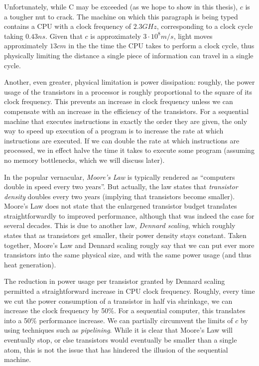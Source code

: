 Unfortunately, while C may be exceeded (as we hope to show in this
thesis), $c$ is a tougher nut to crack.  The machine on which this
paragraph is being typed contains a CPU with a clock frequency of
$2.3GHz$, corresponding to a clock cycle taking $0.43ns$.  Given that
$c$ is approximately $3\cdot10^{8}m/s$, light moves approximately
$13cm$ in the the time the CPU takes to perform a clock cycle, thus
physically limiting the distance a single piece of information can
travel in a single cycle.

Another, even greater, physical limitation is power dissipation:
roughly, the power usage of the transistors in a processor is roughly
proportional to the square of its clock frequency.  This
prevents an increase in clock frequency unless we can compensate with
an increase in the efficiency of the transistors.  For a sequential
machine that executes instructions in exactly the order they are
given, the only way to speed up execution of a program is to increase
the rate at which instructions are executed.  If we can double the
rate at which instructions are processed, we in effect halve the time
it takes to execute some program (assuming no memory bottlenecks,
which we will discuss later).

In the popular vernacular, \textit{Moore's Law} is typically rendered
as ``computers double in speed every two years''.  But actually, the
law states that \textit{transistor density} doubles every two years
(implying that transistors become smaller).  Moore's Law does not
state that the enlargened transistor budget translates
straightforwardly to improved performance, although that was indeed
the case for several decades.  This is due to another law,
\textit{Dennard scaling}, which roughly states that as transistors get
smaller, their power density stays constant.  Taken together, Moore's
Law and Dennard scaling rougly say that we can put ever more
transistors into the same physical size, and with the same power usage
(and thus heat generation).

The reduction in power usage per transistor granted by Dennard scaling
permitted a straightforward increase in CPU clock frequency.  Roughly,
every time we cut the power consumption of a transistor in half via
shrinkage, we can increase the clock frequency by 50\%.  For a
sequential computer, this translates into a 50\% performance increase.
We can partially circumvent the limits of $c$ by using techniques such
as \textit{pipelining}.  While it is clear that Moore's Law will
eventually stop, or else transistors would eventually be smaller than
a single atom, this is not the issue that has hindered the illusion of the
sequential machine.

